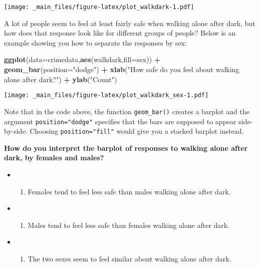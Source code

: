 \documentclass[
]{book}
\newenvironment{Shaded}{\begin{snugshade}}{\end{snugshade}}
\newcommand{\AttributeTok}[1]{\textcolor[rgb]{0.13,0.29,0.53}{#1}}
\newcommand{\FunctionTok}[1]{\textcolor[rgb]{0.13,0.29,0.53}{\textbf{#1}}}
\newcommand{\NormalTok}[1]{#1}
\newcommand{\SpecialCharTok}[1]{\textcolor[rgb]{0.81,0.36,0.00}{\textbf{#1}}}
\newcommand{\StringTok}[1]{\textcolor[rgb]{0.31,0.60,0.02}{#1}}
\providecommand{\tightlist}{%
  \setlength{\itemsep}{0pt}\setlength{\parskip}{0pt}}
\begin{document}
\texttt{[image: \_main\_files/figure-latex/plot\_walkdark-1.pdf]}

A lot of people seem to feel at least fairly safe when walking alone after dark, but how does that response look like for different groups of people? Below is an example showing you how to separate the responses by sex:

\begin{Shaded}
\begin{Highlighting}[]
\FunctionTok{ggplot}\NormalTok{(}\AttributeTok{data=}\NormalTok{crimedata,}\FunctionTok{aes}\NormalTok{(walkdark,}\AttributeTok{fill=}\NormalTok{sex)) }\SpecialCharTok{+} \FunctionTok{geom\_bar}\NormalTok{(}\AttributeTok{position=}\StringTok{"dodge"}\NormalTok{) }\SpecialCharTok{+} \FunctionTok{xlab}\NormalTok{(}\StringTok{"How safe do you feel about walking alone after dark?"}\NormalTok{) }\SpecialCharTok{+} \FunctionTok{ylab}\NormalTok{(}\StringTok{"Count"}\NormalTok{)}
\end{Highlighting}
\end{Shaded}

\texttt{[image: \_main\_files/figure-latex/plot\_walkdark\_sex-1.pdf]}

Note that in the code above, the function \texttt{geom\_bar()} creates a barplot and the argument \texttt{position="dodge"} specifies that the bars are supposed to appear side-by-side. Choosing \texttt{position="fill"} would give you a stacked barplot instead.

\textbf{How do you interpret the barplot of responses to walking alone after dark, by females and males?}

\begin{itemize}
\item
  \begin{enumerate}
  \def\labelenumi{(\Alph{enumi})}
  \tightlist
  \item
    Females tend to feel less safe than males walking alone after dark.\\
  \end{enumerate}
\item
  \begin{enumerate}
  \def\labelenumi{(\Alph{enumi})}
  \setcounter{enumi}{1}
  \tightlist
  \item
    Males tend to feel less safe than females walking alone after dark.\\
  \end{enumerate}
\item
  \begin{enumerate}
  \def\labelenumi{(\Alph{enumi})}
  \setcounter{enumi}{2}
  \tightlist
  \item
    The two sexes seem to feel similar about walking alone after dark.
  \end{enumerate}
\end{itemize}
\end{document}
